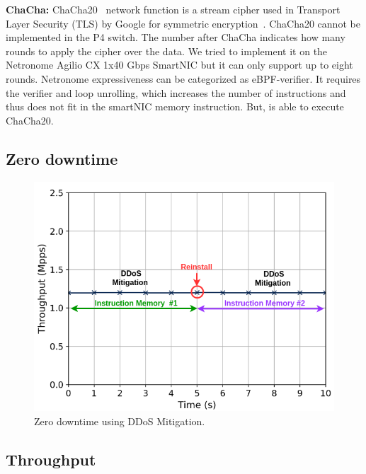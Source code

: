 \textbf{ChaCha:} 
ChaCha20~\cite{rfc8439} network function is a
stream cipher used in Transport Layer Security (TLS) by Google for symmetric
encryption~\cite{google-chacha}.
ChaCha20 cannot be implemented in the P4 switch.
The number after ChaCha indicates how many rounds to apply the cipher over the data.
We tried to implement it on the Netronome Agilio CX 1x40 Gbps SmartNIC but it can only support up to eight rounds. Netronome expressiveness can be categorized as eBPF-verifier. It requires the verifier and loop unrolling, which increases the number of instructions and thus does not fit in the smartNIC memory instruction.
But, \system is able to execute ChaCha20.

\subsection{Zero downtime}

\begin{figure}[ht]
\centering
\includegraphics[width=1.\linewidth]{figures/zerodowntime.png}
\caption{Zero downtime using DDoS Mitigation.}
\label{fig:zerodowntime}
\end{figure}

\subsection{Throughput}

